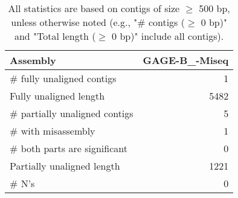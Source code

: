 \documentclass[12pt,a4paper]{article}
\begin{document}
\begin{table}[ht]
\begin{center}
\caption{All statistics are based on contigs of size $\geq$ 500 bp, unless otherwise noted (e.g., "\# contigs ($\geq$ 0 bp)" and "Total length ($\geq$ 0 bp)" include all contigs).}
\begin{tabular}{|l*{1}{|r}|}
\hline
Assembly & GAGE-B\_-Miseq \\ \hline
\# fully unaligned contigs & 1 \\ \hline
Fully unaligned length & 5482 \\ \hline
\# partially unaligned contigs & 5 \\ \hline
\hspace{5mm}\# with misassembly & 1 \\ \hline
\hspace{5mm}\# both parts are significant & 0 \\ \hline
Partially unaligned length & 1221 \\ \hline
\# N's & 0 \\ \hline
\end{tabular}
\end{center}
\end{table}
\end{document}
